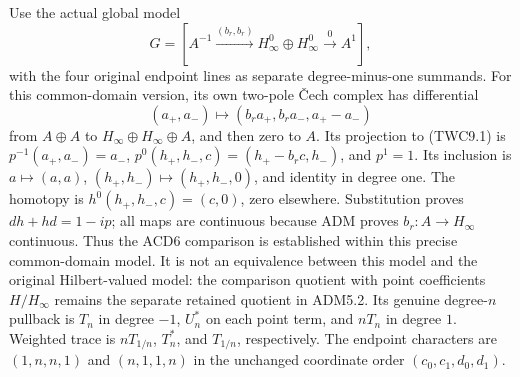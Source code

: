 Use the actual global model \[
G=[A^{-1}\xrightarrow{(b_r,b_r)}H_\infty^0\oplus H_\infty^0
\xrightarrow0 A^1],
\tag{TWC9.1}
\] with the four original endpoint lines as separate degree-minus-one
summands. For this common-domain version, its own two-pole Čech complex
has differential \[
(a_+,a_-)\longmapsto(b_ra_+,b_ra_-,a_+-a_-)
\] from \(A\oplus A\) to \(H_\infty\oplus H_\infty\oplus A\), and then
zero to \(A\). Its projection to (TWC9.1) is \(p^{-1}(a_+,a_-)=a_-\),
\(p^0(h_+,h_-,c)=(h_+-b_rc,h_-)\), and \(p^1=1\). Its inclusion is
\(a\mapsto(a,a)\), \((h_+,h_-)\mapsto(h_+,h_-,0)\), and identity in
degree one. The homotopy is \(h^0(h_+,h_-,c)=(c,0)\), zero elsewhere.
Substitution proves \(dh+hd=1-ip\); all maps are continuous because ADM
proves \(b_r:A\to H_\infty\) continuous. Thus the ACD6 comparison is
established within this precise common-domain model. It is not an
equivalence between this model and the original Hilbert-valued model:
the comparison quotient with point coefficients \(H/H_\infty\) remains
the separate retained quotient in ADM5.2. Its genuine degree-\(n\)
pullback is \(T_n\) in degree \(-1\), \(U_n^*\) on each point term, and
\(nT_n\) in degree \(1\). Weighted trace is \(nT_{1/n}\), \(T_n^*\), and
\(T_{1/n}\), respectively. The endpoint characters are \((1,n,n,1)\) and
\((n,1,1,n)\) in the unchanged coordinate order \((c_0,c_1,d_0,d_1)\).

